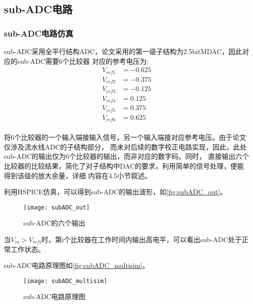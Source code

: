 \subsection{sub-ADC电路}
    \subsubsection{sub-ADC电路仿真}
    sub-ADC采用全平行结构ADC，论文采用的第一级子结构为2.5bitMDAC，因此对应的sub-ADC需要6个比较器
    对应的参考电压为:
    \begin{align*}
        V_{ref1} & = -0.625 \\
        V_{ref2} & = -0.375 \\
        V_{ref3} & = -0.125 \\
        V_{ref4} & = 0.125 \\
        V_{ref5} & = 0.375 \\
        V_{ref6} & = 0.625 \\
    \end{align*}
    \par 将6个比较器的一个输入端接输入信号，另一个输入端接对应参考电压。由于论文仅涉及流水线ADC的子结构部分，
    而未对后续的数字校正电路实现，因此，此处sub-ADC的输出仅为6个比较器的输出，而非对应的数字码。同时，
    直接输出六个比较器的比较结果，简化了对子结构中DAC的要求，利用简单的信号处理，便能得到该级的放大余量，详细
    内容在4.5小节叙述。
    \par 利用HSPICE仿真，可以得到sub-ADC的输出波形，如\autoref{fig:subADC_out}。
    \begin{figure}[H]
        \centering
        \texttt{[image: subADC\_out]}
        \caption{\label{fig:subADC_out}sub-ADC的六个输出}
    \end{figure}
    \par 当$ V_{in} > V_{refi} $时，第i个比较器在工作时间内输出高电平，可以看出sub-ADC处于正常工作状态。
    \par sub-ADC电路原理图如\autoref{fig:subADC_multisim}。
    \begin{figure}[H]
        \centering
        \texttt{[image: subADC\_multisim]}
        \caption{\label{fig:subADC_multisim}sub-ADC电路原理图}
    \end{figure}

